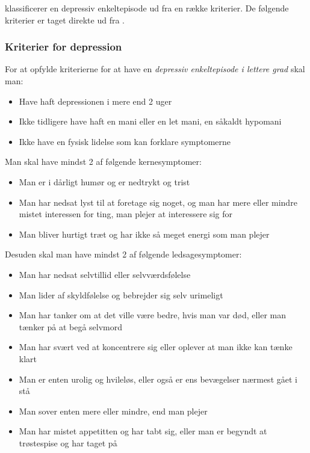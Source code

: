  klassificerer en depressiv enkeltepisode ud fra en række kriterier.
De følgende kriterier er taget direkte ud fra \citet{misc:netpsykdepression}.

\begin{mdframed}
\subsubsection{Kriterier for depression}
For at opfylde kriterierne for at have en \textit{depressiv enkeltepisode i lettere grad} skal man:
\begin{itemize}
	\item Have haft depressionen i mere end 2 uger
	\item Ikke tidligere have haft en mani eller en let mani, en såkaldt hypomani
	\item Ikke have en fysisk lidelse som kan forklare symptomerne
\end{itemize}
Man skal have mindst 2 af følgende kernesymptomer:
\begin{itemize}
	\item Man er i dårligt humør og er nedtrykt og trist
	\item Man har nedsat lyst til at foretage sig noget, og man har mere eller mindre mistet interessen for ting, man plejer at interessere sig for
	\item Man bliver hurtigt træt og har ikke så meget energi som man plejer
\end{itemize}
Desuden skal man have mindst 2 af følgende ledsagesymptomer:
\begin{itemize}
	\item Man har nedsat selvtillid eller selvværdsfølelse
	\item Man lider af skyldfølelse og bebrejder sig selv urimeligt
	\item Man har tanker om at det ville være bedre, hvis man var død, eller man tænker på at begå selvmord
	\item Man har svært ved at koncentrere sig eller oplever at man ikke kan tænke klart
	\item Man er enten urolig og hvileløs, eller også er ens bevægelser nærmest gået i stå
	\item Man sover enten mere eller mindre, end man plejer
	\item Man har mistet appetitten og har tabt sig, eller man er begyndt at trøstespise og har taget på
\end{itemize}
\end{mdframed}

